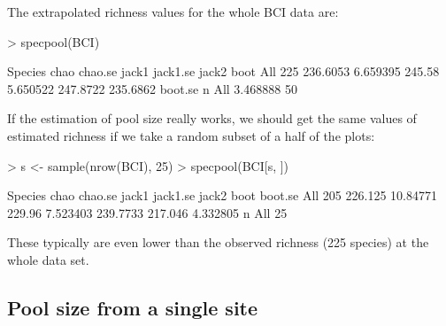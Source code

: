 \documentclass[a4paper,10pt]{amsart}
\begin{document}
The extrapolated richness values for the whole BCI data are:
\begin{Schunk}
\begin{Sinput}
> specpool(BCI)
\end{Sinput}
\begin{Soutput}
    Species     chao  chao.se  jack1 jack1.se    jack2     boot
All     225 236.6053 6.659395 245.58 5.650522 247.8722 235.6862
     boot.se  n
All 3.468888 50
\end{Soutput}
\end{Schunk}
If the estimation of pool size really works, we should get the same
values of estimated richness if we take a random subset of a half of
the plots:
\begin{Schunk}
\begin{Sinput}
> s <- sample(nrow(BCI), 25)
> specpool(BCI[s, ])
\end{Sinput}
\begin{Soutput}
    Species    chao  chao.se  jack1 jack1.se    jack2    boot  boot.se
All     205 226.125 10.84771 229.96 7.523403 239.7733 217.046 4.332805
     n
All 25
\end{Soutput}
\end{Schunk}
These typically are even lower than the observed richness
(225 species) at the whole data set.

\subsection{Pool size from a single site}
\end{document}
